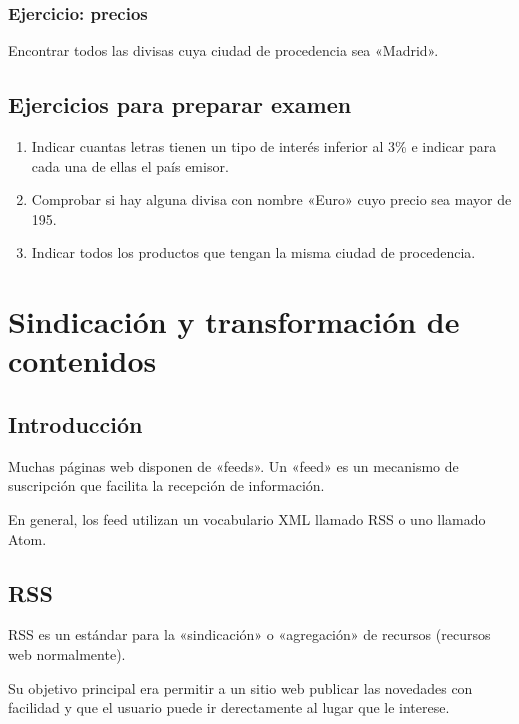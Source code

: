 \documentclass[letterpaper,10pt,spanish]{sphinxmanual}
\begin{document}
\subsection{Ejercicio: precios}
\label{\detokenize{tema6:ejercicio-precios}}
Encontrar todos las divisas cuya ciudad de procedencia sea «Madrid».


\section{Ejercicios para preparar examen}
\label{\detokenize{tema6:ejercicios-para-preparar-examen}}\begin{enumerate}
\item {} 
Indicar cuantas letras tienen un tipo de interés inferior al 3\% e indicar para cada una de ellas el país emisor.

\item {} 
Comprobar si hay alguna divisa con nombre «Euro» cuyo precio sea mayor de 195.

\item {} 
Indicar todos los productos que tengan la misma ciudad de procedencia.

\end{enumerate}


\chapter{Sindicación y transformación de contenidos}
\label{\detokenize{tema7:sindicacion-y-transformacion-de-contenidos}}\label{\detokenize{tema7::doc}}

\section{Introducción}
\label{\detokenize{tema7:introduccion}}
Muchas páginas web disponen de «feeds». Un «feed» es un mecanismo de suscripción que facilita la recepción de información.

En general, los feed utilizan un vocabulario XML llamado RSS o uno llamado Atom.


\section{RSS}
\label{\detokenize{tema7:rss}}
RSS es un estándar para la «sindicación» o «agregación» de recursos (recursos web normalmente).

Su objetivo principal era permitir a un sitio web publicar las novedades con facilidad y que el usuario puede ir derectamente al lugar que le interese.
\end{document}
